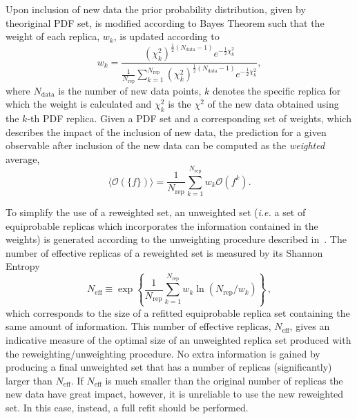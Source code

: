 Upon inclusion of new data the prior probability distribution, given by theoriginal PDF set, is modified according
to Bayes Theorem such that the weight of each replica, $w_k$, is updated according to
\begin{equation}
 w_k = \frac{(\chi^2_k)^{\frac{1}{2} (N_{\mathrm{data}}-1) } e^{-\frac{1}{2}\chi^2_k}}
          { \frac{1}{N_{\mathrm{rep}}} \sum^{N_{\mathrm{rep}}}_{k=1}(\chi^2_k)^{\frac{1}{2}(N_{\mathrm{data}}-1)} e^{-\frac{1}{2}\chi^2_k}  },
\end{equation}
where $N_{\mathrm{data}}$ is the number of new data points, $k$ denotes the specific replica for which the 
weight is calculated and $\chi^2_k$ is the $\chi^2$ of the new data obtained using the $k$-th PDF replica.
Given a PDF set and a corresponding set of weights, which describes the impact of the
inclusion of new data, the prediction for a given observable after inclusion of the new data can be computed as the {\em weighted} average,
\begin{equation}
\langle\mathcal{O}(\{f\})\rangle =  \frac{1}{N_{\mathrm{rep}}} \sum_{k=1}^{N_{\mathrm{rep}}} w_k \mathcal{O}(f^{k}).
\end{equation}

To simplify the use of a reweighted set, an unweighted set ({\em i.e.} a set of equiprobable replicas which incorporates 
the information contained in the weights) is generated according to the unweighting procedure described in~\cite{Ball:2011gg}. 
The number of effective replicas of a reweighted set is measured by its Shannon 
Entropy~\cite{Ball:2010gb}
\begin{equation}
\label{eq:shannon}
N_\mathrm{eff}\equiv 
\exp\left\{\frac{1}{N_\mathrm{rep}}\sum_{k=1}^{N_\mathrm{rep}}w_k\ln(N_\mathrm{rep}/w_k)\right\}\,,
\end{equation}
which corresponds to the size of a refitted equiprobable replica set containing the same amount of information. 
This number of effective replicas, $N_\mathrm{eff}$, gives an indicative measure of the optimal size of an 
unweighted replica set produced with the reweighting/unweighting procedure. No extra information is 
gained by producing a final unweighted set that has a number of replicas (significantly) larger than 
$N_\mathrm{eff}$.  If $N_\mathrm{eff}$ is much smaller than the original number of replicas the new data have great impact, however, it is unreliable to use the new reweighted set. In this case, instead, a full refit should be performed.

